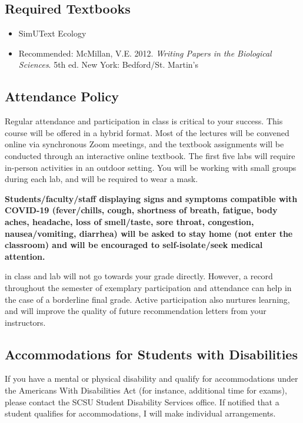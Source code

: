 \documentclass{tufte-handout}
\begin{document}
\begin{fullwidth}
\subsection{Required Textbooks}

\begin{itemize}
	\item SimUText Ecology
	\item Recommended: McMillan, V.E. 2012. \emph{Writing Papers in the Biological Sciences}. 5th ed. New York: Bedford/St. Martin's
\end{itemize}

\subsection{Attendance Policy}

Regular attendance and participation in class is critical to your success. This course will be offered in a hybrid format. Most of the lectures will be convened online via synchronous Zoom meetings, and the textbook assignments will be conducted through an interactive online textbook. The first five labs will require in-person activities in an outdoor setting. You will be working with small groups during each lab, and will be required to wear a mask. 

\textbf{Students/faculty/staff displaying signs and symptoms compatible with COVID-19 (fever/chills, cough, shortness of breath, fatigue, body aches, headache, loss of smell/taste, sore throat, congestion,  nausea/vomiting, diarrhea) will be asked to stay home (not enter the classroom) and will be encouraged to self-isolate/seek medical attention.}

 in class and lab will not go towards your grade directly. However, a record throughout the semester of exemplary participation and attendance can help in the case of a borderline final grade. Active participation also nurtures learning, and will improve the quality of future recommendation letters from your instructors.  

\subsection{Accommodations for Students with Disabilities}

If you have a mental or physical disability and qualify for accommodations under the Americans With Disabilities Act (for instance, additional time for exams), please contact the SCSU Student Disability Services office. If notified that a student qualifies for accommodations, I will make individual arrangements.


\end{fullwidth}
\end{document}
